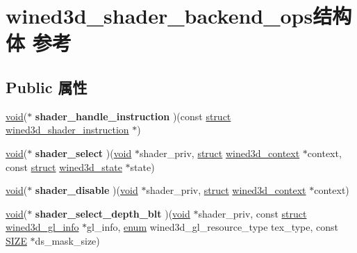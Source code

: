 \hypertarget{structwined3d__shader__backend__ops}{}\section{wined3d\+\_\+shader\+\_\+backend\+\_\+ops结构体 参考}
\label{structwined3d__shader__backend__ops}
\subsection*{Public 属性}
\begin{DoxyCompactItemize}
\item 
\mbox{\label{structwined3d__shader__backend__ops_aeba5b96d9f776d7816177e2e75ce858e}} 
\hyperlink{interfacevoid}{void}($\ast$ {\bfseries shader\+\_\+handle\+\_\+instruction} )(const \hyperlink{interfacestruct}{struct} \hyperlink{structwined3d__shader__instruction}{wined3d\+\_\+shader\+\_\+instruction} $\ast$)
\item 
\mbox{\label{structwined3d__shader__backend__ops_a14c9259168fe12907950b9c27b76e8e0}} 
\hyperlink{interfacevoid}{void}($\ast$ {\bfseries shader\+\_\+select} )(\hyperlink{interfacevoid}{void} $\ast$shader\+\_\+priv, \hyperlink{interfacestruct}{struct} \hyperlink{structwined3d__context}{wined3d\+\_\+context} $\ast$context, const \hyperlink{interfacestruct}{struct} \hyperlink{structwined3d__state}{wined3d\+\_\+state} $\ast$state)
\item 
\mbox{\label{structwined3d__shader__backend__ops_ac09079df0f1de5a10ccb300fb0260c7d}} 
\hyperlink{interfacevoid}{void}($\ast$ {\bfseries shader\+\_\+disable} )(\hyperlink{interfacevoid}{void} $\ast$shader\+\_\+priv, \hyperlink{interfacestruct}{struct} \hyperlink{structwined3d__context}{wined3d\+\_\+context} $\ast$context)
\item 
\mbox{\label{structwined3d__shader__backend__ops_af17b1fc04523ecb57de11185c1ffc89b}} 
\hyperlink{interfacevoid}{void}($\ast$ {\bfseries shader\+\_\+select\+\_\+depth\+\_\+blt} )(\hyperlink{interfacevoid}{void} $\ast$shader\+\_\+priv, const \hyperlink{interfacestruct}{struct} \hyperlink{structwined3d__gl__info}{wined3d\+\_\+gl\+\_\+info} $\ast$gl\+\_\+info, \hyperlink{interfaceenum}{enum} wined3d\+\_\+gl\+\_\+resource\+\_\+type tex\+\_\+type, const \hyperlink{structtag_s_i_z_e}{S\+I\+ZE} $\ast$ds\+\_\+mask\+\_\+size)

\end{DoxyCompactItemize}

